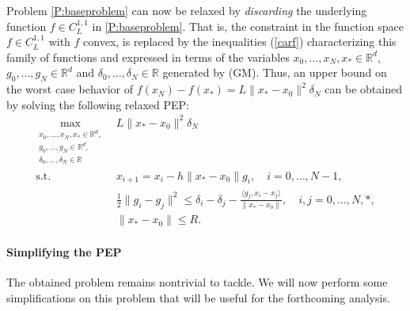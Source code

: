 \documentclass[12pt]{article}
\numberwithin{equation}{section}
\theoremstyle{definition}
\theoremstyle{remark}
\newcommand{\mainalg}{\text{FO}\xspace}
\begin{document}
 Problem \eqref{P:baseproblem} can now be
relaxed by \emph{discarding} the underlying function $f \in C^{1,1}_L$ in
\eqref{P:baseproblem}. That is, the constraint in the function space $f\in C^{1,1}_L$ with $f$
convex, is replaced by the inequalities (\ref{carf}) characterizing this family of functions
and expressed in terms of the variables $x_0,\dots,x_N,x_\ast\in\mathbb{R}^d$,
$g_0,\dots,g_N\in\mathbb{R}^d$ and $\delta_0,\dots,\delta_N\in\mathbb{R}$ generated by (GM).
Thus, an upper bound on the worst case behavior of $f(x_N)-f(x_\ast)= L \|x_\ast -x_0\|^2
\delta_N$
 can be obtained by solving the following relaxed PEP:
\begin{align*}
    \max_{\substack{x_0,\dots,x_N,x_\ast\in\mathbb{R}^d,\\g_0,\dots,g_N\in\mathbb{R}^d,\\\delta_0,\dots,\delta_N \in\mathbb{R}}}\ & L\|x_\ast-x_0\|^2 \delta_N \\
    \text{s.t. }\quad
                        & x_{i+1} = x_i - h \|x_\ast-x_0\| g_i,\quad i=0,\dots,N-1,\\
                        & \frac{1}{2}\| g_i - g_j \| ^2 \leq \delta_i - \delta_j - \frac{ \langle g_j, x_i-x_j \rangle}{\|x_\ast-x_0\|},\quad  i,j=0,\dots,N,\ast, \\
                        &\|x_\ast-x_0\|\leq R.
\end{align*}

\paragraph{Simplifying the PEP} The obtained problem remains nontrivial to tackle. We will now
perform some simplifications on this problem that will be useful for the forthcoming analysis.
\end{document}
